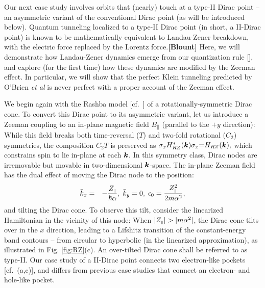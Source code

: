\documentclass[aps, prb, showpacs, twocolumn, notitlepage, superscriptaddress]{revtex4-1}
\begin{document}
Our next case study involves orbits that (nearly) touch at a type-II Dirac point\cite{soluyanov_type-ii_2015,muechler_tilted_2016} -- an asymmetric variant of the conventional Dirac point (as will be introduced below). Quantum tunneling localized to a type-II Dirac point  (in short, a II-Dirac point) is known to be mathematically equivalent to  Landau-Zener breakdown, with the electric force replaced by the Lorentz force\cite{AALG,obrien_magnetic_2016}.\textbf{[Blount]} Here, we will demonstrate how Landau-Zener dynamics emerge from our quantization rule [], and explore (for the first time) how these dynamics are modified by the Zeeman effect. In particular, we will show that the perfect Klein tunneling predicted by O'Brien \textit{et al}\cite{obrien_magnetic_2016} is never perfect with a proper account of the Zeeman effect. 


We begin again with the Rashba model [cf.\ ] of a rotationally-symmetric Dirac cone. To convert this Dirac point to its asymmetric variant, 
let us introduce a Zeeman coupling to an in-plane magnetic field $B_\parallel$ (parallel to the $+y$ direction):
While this field breaks both time-reversal ($T$) and two-fold rotational ($C_2$) symmetries, the composition $C_2T$ is preserved as $\sigma_x H^*_{RZ}(\boldsymbol{k})\sigma_x{=}H_{RZ}(\boldsymbol{k}),$ which constrains spin to lie in-plane at each $\boldsymbol{k}$. In this symmetry class, Dirac nodes are irremovable but movable   in two-dimensional $\boldsymbol{k}$-space. The in-plane Zeeman field has the dual effect of  moving the Dirac node  to the position:
\begin{eqnarray}
\bar{k}_x & = & -\frac{Z_{\scriptscriptstyle{\parallel}}}{\hbar\alpha},\;\bar{k}_y=0,\;\epsilon_{0}=\frac{Z_{\scriptscriptstyle{\parallel}}^{2}}{2m\alpha^2},\label{whereisdiracpoint}
\end{eqnarray}
and tilting the Dirac cone. To observe this tilt, consider the linearized Hamiltonian in the vicinity of this node: 
When $|\zpar|>|m\alpha^2|$, the Dirac cone tilts over in the $x$ direction, leading to a Lifshitz transition  of the constant-energy band contours -- from circular to hyperbolic (in the linearized approximation), as illustrated in Fig. \ref{fig:RZ}(c). An over-tilted Dirac cone shall be referred to as type-II. Our case study of a II-Dirac point  connects  two electron-like  pockets [cf.\ (a,c)], and  differs from previous case studies\cite{obrien_magnetic_2016,AALG} that connect an electron- and hole-like pocket.
\end{document}

